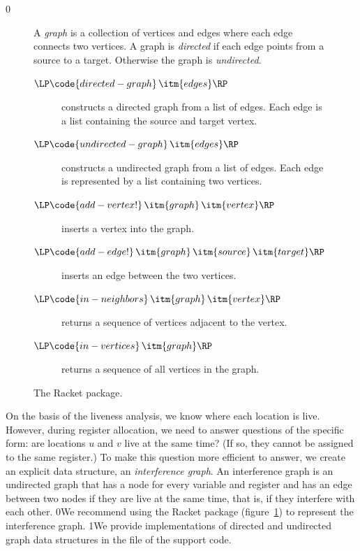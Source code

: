 \documentclass[7x10]{TimesAPriori_MIT}%
\def\racketEd{0}
\def\pythonEd{1}
\def\edition{1}
\newcommand{\racket}[1]{{\if\edition\racketEd{#1}\fi}}
\newcommand{\pythonColor}[0]{}
\newcommand{\python}[1]{{\if\edition\pythonEd\pythonColor #1\fi}}
\numberwithin{theorem}{chapter}
\numberwithin{definition}{chapter}
\numberwithin{equation}{chapter}
\begin{document}
{\if\edition\racketEd
\begin{figure}[tp]
  \small
  \begin{tcolorbox}[title=\href{https://docs.racket-lang.org/graph/index.html}{The Racket Graph Library}]
    A \emph{graph} is a collection of vertices and edges where each
    edge connects two vertices.  A graph is \emph{directed} if each
    edge points from a source to a target.  Otherwise the graph is
    \emph{undirected}.
  \begin{description}
  \item[$\LP\code{directed-graph}\,\itm{edges}\RP$] constructs a
    directed graph from a list of edges. Each edge is a list
    containing the source and target vertex.
  \item[$\LP\code{undirected-graph}\,\itm{edges}\RP$] constructs a
    undirected graph from a list of edges. Each edge is represented by
    a list containing two vertices.
  \item[$\LP\code{add-vertex!}\,\itm{graph}\,\itm{vertex}\RP$]
    inserts a vertex into the graph.
  \item[$\LP\code{add-edge!}\,\itm{graph}\,\itm{source}\,\itm{target}\RP$]
    inserts an edge between the two vertices.
  \item[$\LP\code{in-neighbors}\,\itm{graph}\,\itm{vertex}\RP$]
    returns a sequence of vertices adjacent to the vertex.
  \item[$\LP\code{in-vertices}\,\itm{graph}\RP$]
    returns a sequence of all vertices in the graph.
  \end{description}
\end{tcolorbox}
  \caption{The Racket  package.}
  \label{fig:graph}
\end{figure}
\fi}

On the basis of the liveness analysis, we know where each location is
live.  However, during register allocation, we need to answer
questions of the specific form: are locations $u$ and $v$ live at the
same time?  (If so, they cannot be assigned to the same register.)  To
make this question more efficient to answer, we create an explicit
data structure, an \emph{interference
  graph}.  An interference graph is
an undirected graph that has a node for every variable and register
and has an edge between two nodes if they are
live at the same time, that is, if they interfere with each other.
%
\racket{We recommend using the Racket  package
  (figure~\ref{fig:graph}) to represent the interference graph.}
%
\python{We provide implementations of directed and undirected graph
  data structures in the file \code{graph.py} of the support code.}
\end{document}
